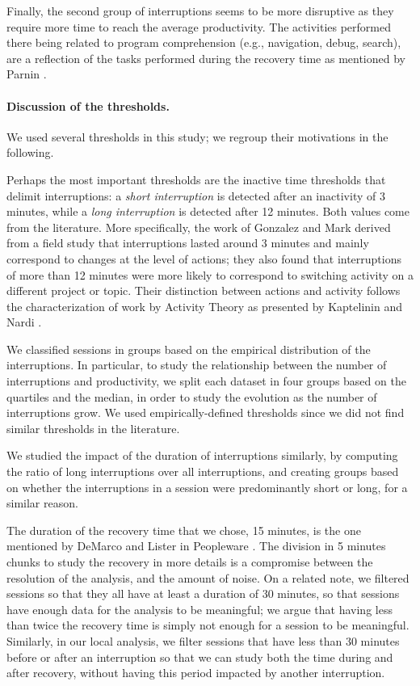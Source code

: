 \documentclass[times]{smrauth}
\begin{document}
Finally, the second group of interruptions seems to be more disruptive as they require more time to reach the average productivity. The activities performed there being related to program comprehension (e.g., navigation, debug, search), are a reflection of the tasks performed during the recovery time as mentioned by Parnin \cite{PR11}.


\paragraph{Discussion of the thresholds.} We used several thresholds in this study; we regroup their motivations in the following. 


Perhaps the most important thresholds are the inactive time thresholds that delimit interruptions: a \emph{short interruption} is detected after an inactivity of 3 minutes, while a \emph{long interruption} is detected after 12 minutes. Both values come from the literature. More specifically, the work of Gonzalez and Mark \cite{GM04} derived from a field study that interruptions lasted around 3 minutes and mainly correspond to changes at the level of actions; they also found that interruptions of more than 12 minutes were more likely to correspond to switching activity on a different project or topic. Their distinction between actions and activity follows the characterization of work by Activity Theory as presented by Kaptelinin and Nardi \cite{KaptelininN07}.

We classified sessions in groups based on the empirical distribution of the interruptions. In particular, to study the relationship between the number of interruptions and productivity, we split each dataset in four groups based on the quartiles and the median, in order to study the evolution as the number of interruptions grow. We used empirically-defined thresholds since we did not find similar thresholds in the literature. %

We studied the impact of the duration of interruptions similarly, by computing the ratio of long interruptions over all interruptions, and creating groups based on whether the interruptions in a session were predominantly short or long, for a similar reason.

The duration of the recovery time that we chose, 15 minutes, is the one mentioned by DeMarco and Lister in Peopleware \cite{demarco1999peopleware}. The division in 5 minutes chunks to study the recovery in more details is a compromise between the resolution of the analysis, and the amount of noise. On a related note, we filtered sessions so that they all have at least a duration of 30 minutes, so that sessions have enough data for the analysis to be meaningful; we argue that having less than twice the recovery time is simply not enough for a session to be meaningful. Similarly, in our local analysis, we filter sessions that have less than 30 minutes before or after an interruption so that we can study both the time during and after recovery, without having this period impacted by another interruption.
\end{document}
